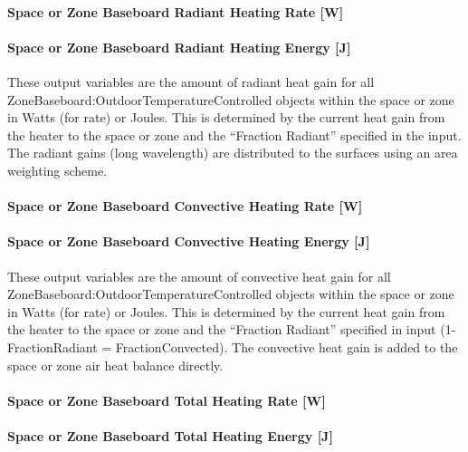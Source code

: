 \paragraph{Space or Zone Baseboard Radiant Heating Rate {[}W{]}}\label{zone-baseboard-radiant-heating-rate-w-2}

\paragraph{Space or Zone Baseboard Radiant Heating Energy {[}J{]}}\label{zone-baseboard-radiant-heating-energy-j-2}

These output variables are the amount of radiant heat gain for all Zone\-Baseboard:\-Outdoor\-Temperature\-Controlled objects within the space or zone in Watts (for rate) or Joules. This is determined by the current heat gain from the heater to the space or zone and the ``Fraction Radiant'' specified in the input. The radiant gains (long wavelength) are distributed to the surfaces using an area weighting scheme.

\paragraph{Space or Zone Baseboard Convective Heating Rate {[}W{]}}\label{zone-baseboard-convective-heating-rate-w-2}

\paragraph{Space or Zone Baseboard Convective Heating Energy {[}J{]}}\label{zone-baseboard-convective-heating-energy-j-2}

These output variables are the amount of convective heat gain for all Zone\-Baseboard:\-Outdoor\-Temperature\-Controlled objects within the space or zone in Watts (for rate) or Joules. This is determined by the current heat gain from the heater to the space or zone and the ``Fraction Radiant'' specified in input (1-FractionRadiant = FractionConvected). The convective heat gain is added to the space or zone air heat balance directly.

\paragraph{Space or Zone Baseboard Total Heating Rate {[}W{]}}\label{zone-baseboard-total-heating-rate-w-2}

\paragraph{Space or Zone Baseboard Total Heating Energy {[}J{]}}\label{zone-baseboard-total-heating-energy-j-2}

